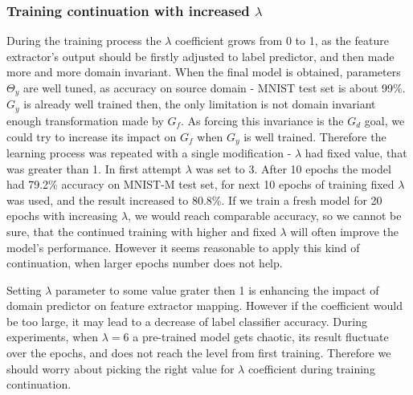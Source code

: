 \documentclass{article}
\begin{document}
\subsubsection{Training continuation with increased $\lambda$}
During the training process the $\lambda$ coefficient grows from 0 to 1, as the feature extractor's output should be firstly adjusted to label predictor, and then made more and more domain invariant. When the final model is obtained, parameters $\Theta_{y}$ are well tuned, as accuracy on source domain - MNIST test set is about 99\%. $G_{y}$ is already well trained then, the only limitation is not domain invariant enough transformation made by $G_{f}$. As forcing this invariance is the $G_{d}$ goal, we could try to increase its impact on $G_{f}$ when $G_{y}$ is well trained. Therefore the learning process was repeated with a single modification - $\lambda$ had fixed value, that was greater than 1. In first attempt $\lambda$ was set to 3. After 10 epochs the model had 79.2\% accuracy on MNIST-M test set, for next 10 epochs of training fixed $\lambda$ was used, and the result increased to 80.8\%. If we train a fresh model for 20 epochs with increasing $\lambda$, we would reach comparable accuracy, so we cannot be sure, that the continued training with higher and fixed $\lambda$ will often improve the model's performance. However it seems reasonable to apply this kind of continuation, when larger epochs number does not help.
\par
Setting $\lambda$ parameter to some value grater then 1 is enhancing the impact of domain predictor on feature extractor mapping. However if the coefficient would be too large, it may lead to a decrease of label classifier accuracy. During experiments, when $\lambda = 6$ a pre-trained model gets chaotic, its result fluctuate over the epochs, and does not reach the level from first training. Therefore we should worry about picking the right value for $\lambda$ coefficient during training continuation.
\end{document}
